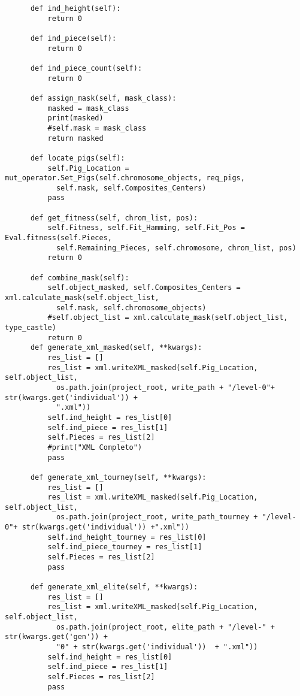 \begin{verbatim}
      def ind_height(self):
          return 0
      
      def ind_piece(self):
          return 0
      
      def ind_piece_count(self):
          return 0

      def assign_mask(self, mask_class):
          masked = mask_class
          print(masked)
          #self.mask = mask_class 
          return masked

      def locate_pigs(self):
          self.Pig_Location = mut_operator.Set_Pigs(self.chromosome_objects, req_pigs, 
            self.mask, self.Composites_Centers)
          pass
      
      def get_fitness(self, chrom_list, pos):
          self.Fitness, self.Fit_Hamming, self.Fit_Pos = Eval.fitness(self.Pieces, 
            self.Remaining_Pieces, self.chromosome, chrom_list, pos)
          return 0
      
      def combine_mask(self):
          self.object_masked, self.Composites_Centers = xml.calculate_mask(self.object_list, 
            self.mask, self.chromosome_objects)
          #self.object_list = xml.calculate_mask(self.object_list, type_castle)
          return 0
      def generate_xml_masked(self, **kwargs):
          res_list = []
          res_list = xml.writeXML_masked(self.Pig_Location, self.object_list, 
            os.path.join(project_root, write_path + "/level-0"+ str(kwargs.get('individual')) + 
            ".xml"))
          self.ind_height = res_list[0]
          self.ind_piece = res_list[1]
          self.Pieces = res_list[2]
          #print("XML Completo")
          pass
      
      def generate_xml_tourney(self, **kwargs):
          res_list = []
          res_list = xml.writeXML_masked(self.Pig_Location, self.object_list, 
            os.path.join(project_root, write_path_tourney + "/level-0"+ str(kwargs.get('individual')) +".xml"))
          self.ind_height_tourney = res_list[0]
          self.ind_piece_tourney = res_list[1]
          self.Pieces = res_list[2]
          pass

      def generate_xml_elite(self, **kwargs):
          res_list = []
          res_list = xml.writeXML_masked(self.Pig_Location, self.object_list, 
            os.path.join(project_root, elite_path + "/level-" + str(kwargs.get('gen')) + 
            "0" + str(kwargs.get('individual'))  + ".xml"))
          self.ind_height = res_list[0]
          self.ind_piece = res_list[1]
          self.Pieces = res_list[2]
          pass
      


\end{verbatim}
